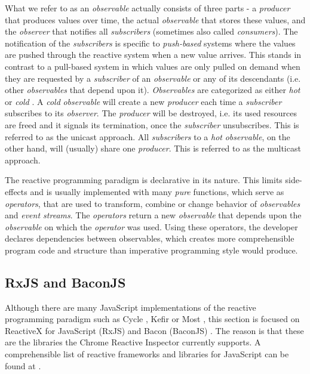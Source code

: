 	What we refer to as an \emph{observable} actually consists of three parts - a \emph{producer} that produces values over time, the actual \emph{observable} that stores these values, and the \emph{observer} that notifies all \emph{subscribers} (sometimes also called \emph{consumers}). The notification of the \emph{subscribers} is specific to \emph{push-based} systems where the values are pushed through the reactive system when a new value arrives. This stands in contrast to a pull-based system in which values are only pulled on demand when they are requested by a \emph{subscriber} of an \emph{observable} or any of its descendants (i.e. other \emph{observables} that depend upon it).
	\emph{Observables} are categorized as either \emph{hot} or \emph{cold} \cite{HotVsCold}. A \emph{cold} \emph{observable} will create a new \emph{producer} each time a \emph{subscriber} subscribes to its \emph{observer}. The \emph{producer} will be destroyed, i.e. its used resources are freed and it signals its termination, once the \emph{subscriber} unsubscribes. %
	 This is referred to as the unicast approach. All \emph{subscribers} to a \emph{hot} \emph{observable}, on the other hand, will (usually) share one \emph{producer}. This is referred to as the multicast approach.
	
	The reactive programming paradigm is declarative in its nature. This limits side-effects and is usually implemented with many \emph{pure} functions, which serve as \emph{operators}, that are used to transform, combine or change behavior of \emph{observables} and \emph{event streams}. The \emph{operators} return a new \emph{observable} that depends upon the \emph{observable} on which the \emph{operator} was used. Using these operators, the developer declares dependencies between observables, which creates more comprehensible program code and structure \cite[Why Reactive Programming?]{ReactiveInspector} than imperative programming style would produce. 	


	\subsection{RxJS and BaconJS}
	Although there are many JavaScript implementations of the reactive programming paradigm such as Cycle \cite{CycleJS}, Kefir \cite{KefirJS} or  Most \cite{MostJS}, this section is focused on ReactiveX for JavaScript (RxJS) \cite{RxJS} and Bacon (BaconJS) \cite{BaconJS}.%
	 The reason is that these are the libraries the Chrome Reactive Inspector currently supports. A comprehensible list of reactive frameworks and libraries for JavaScript can be found at \cite{FRPJSList}.
	
